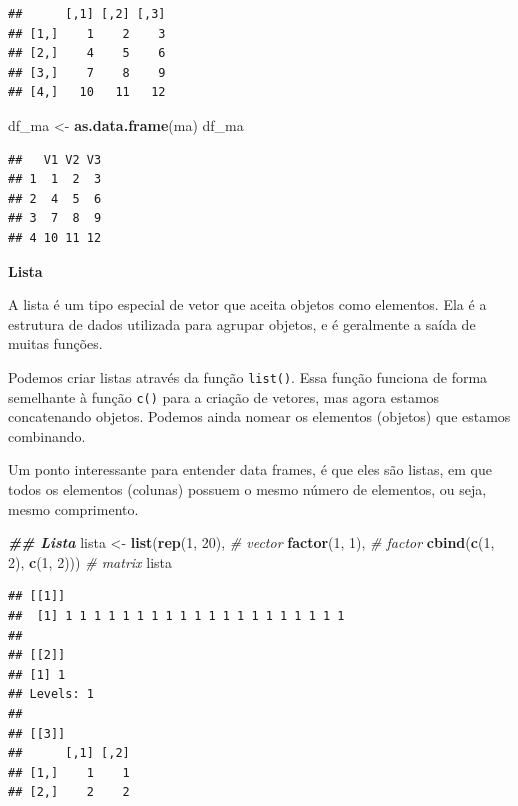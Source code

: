 \documentclass[
]{article}
\newenvironment{Shaded}{\begin{snugshade}}{\end{snugshade}}
\newcommand{\CommentTok}[1]{\textcolor[rgb]{0.56,0.35,0.01}{\textit{#1}}}
\newcommand{\DecValTok}[1]{\textcolor[rgb]{0.00,0.00,0.81}{#1}}
\newcommand{\DocumentationTok}[1]{\textcolor[rgb]{0.56,0.35,0.01}{\textbf{\textit{#1}}}}
\newcommand{\FunctionTok}[1]{\textcolor[rgb]{0.13,0.29,0.53}{\textbf{#1}}}
\newcommand{\NormalTok}[1]{#1}
\newcommand{\OtherTok}[1]{\textcolor[rgb]{0.56,0.35,0.01}{#1}}
\begin{document}
\begin{verbatim}
##      [,1] [,2] [,3]
## [1,]    1    2    3
## [2,]    4    5    6
## [3,]    7    8    9
## [4,]   10   11   12
\end{verbatim}

\begin{Shaded}
\begin{Highlighting}[]
\NormalTok{df\_ma }\OtherTok{\textless{}{-}} \FunctionTok{as.data.frame}\NormalTok{(ma)}
\NormalTok{df\_ma}
\end{Highlighting}
\end{Shaded}

\begin{verbatim}
##   V1 V2 V3
## 1  1  2  3
## 2  4  5  6
## 3  7  8  9
## 4 10 11 12
\end{verbatim}

\textbf{Lista}

A lista é um tipo especial de vetor que aceita objetos como elementos. Ela é a estrutura de dados utilizada para agrupar objetos, e é geralmente a saída de muitas funções.

Podemos criar listas através da função \texttt{list()}. Essa função funciona de forma semelhante à função \texttt{c()} para a criação de vetores, mas agora estamos concatenando objetos. Podemos ainda nomear os elementos (objetos) que estamos combinando.

Um ponto interessante para entender data frames, é que eles são listas, em que todos os elementos (colunas) possuem o mesmo número de elementos, ou seja, mesmo comprimento.

\begin{Shaded}
\begin{Highlighting}[]
\DocumentationTok{\#\# Lista}
\NormalTok{lista }\OtherTok{\textless{}{-}} \FunctionTok{list}\NormalTok{(}\FunctionTok{rep}\NormalTok{(}\DecValTok{1}\NormalTok{, }\DecValTok{20}\NormalTok{), }\CommentTok{\# vector}
              \FunctionTok{factor}\NormalTok{(}\DecValTok{1}\NormalTok{, }\DecValTok{1}\NormalTok{), }\CommentTok{\# factor}
              \FunctionTok{cbind}\NormalTok{(}\FunctionTok{c}\NormalTok{(}\DecValTok{1}\NormalTok{, }\DecValTok{2}\NormalTok{), }\FunctionTok{c}\NormalTok{(}\DecValTok{1}\NormalTok{, }\DecValTok{2}\NormalTok{))) }\CommentTok{\# matrix}
\NormalTok{lista}
\end{Highlighting}
\end{Shaded}

\begin{verbatim}
## [[1]]
##  [1] 1 1 1 1 1 1 1 1 1 1 1 1 1 1 1 1 1 1 1 1
## 
## [[2]]
## [1] 1
## Levels: 1
## 
## [[3]]
##      [,1] [,2]
## [1,]    1    1
## [2,]    2    2
\end{verbatim}
\end{document}
